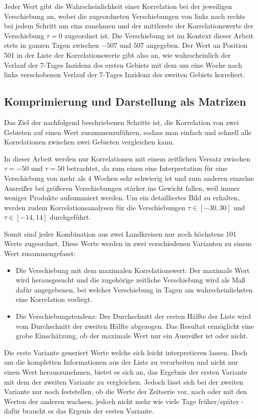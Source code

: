 Jeder Wert gibt die Wahrscheinlichkeit einer Korrelation bei der jeweiligen Verschiebung an, wobei die zugeordneten Verschiebungen von links nach rechts bei jedem Schritt um eins zunehmen und der mittlerste der Korrelationswerte der Verschiebung $\tau = 0$ zugeordnet ist. Die Verschiebung ist im Kontext dieser Arbeit stets in ganzen Tagen zwischen $-507$ und $507$ angegeben. Der Wert an Position 501 in der Liste der Korrelationswerte gibt also an, wie wahrscheinlich der Verlauf der 7-Tages Inzidenz des ersten Gebiets mit dem um eine Woche nach links verschobenen Verlauf der 7-Tages Inzidenz des zweiten Gebiets korreliert.


\subsection{Komprimierung und Darstellung als Matrizen}
Das Ziel der nachfolgend beschriebenen Schritte ist, die Korrelation von zwei Gebieten auf einen Wert zusammenzuführen, sodass man einfach und schnell alle Korrelationen zwischen zwei Gebieten vergleichen kann.

In dieser Arbeit werden nur Korrelationen mit einem zeitlichen Versatz zwischen $\tau=-50$ und $\tau=50$ betrachtet, da zum einen eine Interpretation für eine Verschiebung von mehr als 4 Wochen sehr schwierig ist und zum anderen einzelne Ausreißer bei größeren Verschiebungen stärker ins Gewicht fallen, weil immer weniger Produkte aufsummiert werden.
Um ein detailliertes Bild zu erhalten, werden zudem Korrelationsanalysen für die Verschiebungen $\tau\in[-30,30]$ und $\tau\in[-14,14]$ durchgeführt.

Somit sind jeder Kombination aus zwei Landkreisen nur noch höchstens 101 Werte zugeordnet. Diese Werte werden in zwei verschiedenen Varianten zu einem Wert zusammengefasst:
\begin{itemize}
    \item Die Verschiebung mit dem maximalen Korrelationswert: Der maximale Wert wird herausgesucht und die zugehörige zeitliche Verschiebung wird als Maß dafür angegebenen, bei welcher Verschiebung in Tagen am wahrscheinlichsten eine Korrelation vorliegt.
    \item Die Verschiebungstendenz: Der Durchschnitt der ersten Hälfte der Liste wird vom Durchschnitt der zweiten Hälfte abgezogen. Das Resultat ermöglicht eine grobe Einschätzung, ob der maximale Wert nur ein Ausreißer ist oder nicht.
\end{itemize}
Die erste Variante generiert Werte welche sich leicht interpretieren lassen. Doch um die kompletten Informationen aus der Liste zu verarbeiten und nicht nur einen Wert herauszunehmen, bietet es sich an, das Ergebnis der ersten Variante mit dem der zweiten Variante zu vergleichen.
Jedoch lässt sich bei der zweiten Variante nur noch feststellen, ob die Werte der Zeitserie vor, nach oder mit den Werten der anderen wachsen, jedoch nicht mehr wie viele Tage früher/später - dafür braucht es das Ergenis der ersten Variante.

